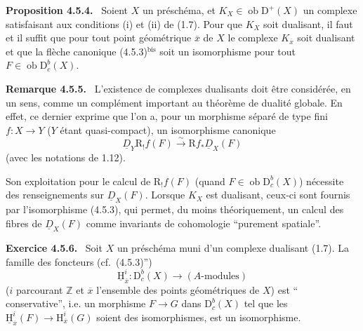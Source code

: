\documentclass[11pt]{article}
\providecommand{\uH}{\underline{\mathrm H}}
\newenvironment{statement}[1]{\par\medskip\noindent\textbf{#1.}\ }{\par\medskip}
\renewcommand{\H}{\mathrm{H}}
\newcommand{\R}{\mathrm{R}}\newcommand{\RHomCore}{\mathrm{RHom}}
\newcommand{\D}{\mathrm{D}}
\newcommand{\Z}{\mathbb{Z}}
\newcommand{\ob}{\operatorname{ob}}
\newcommand{\ol}[1]{\overline{#1}}
\providecommand{\ob}{\operatorname{ob}}
\providecommand{\R}{\mathrm R}
\providecommand{\Z}{\mathbb Z}
\begin{document}
\begin{statement}{Proposition 4.5.4}
Soient $X$ un préschéma, et $K_X\in\ob\D^+(X)$ un complexe satisfaisant aux conditions (i) et (ii) de (1.7). Pour que $K_X$ soit dualisant, il faut et il suffit que pour tout point géométrique $\ol{x}$ de $X$ le complexe $K_{\ol{x}}$ soit dualisant et que la flèche canonique (4.5.3)$^{\mathrm{bis}}$ soit un isomorphisme pour tout $F\in\ob\D_c^b(X)$.
\end{statement}

\begin{statement}{Remarque 4.5.5}
L'existence de complexes dualisants doit être considérée, en un sens, comme un complément important au théorème de dualité globale. En effet, ce dernier exprime que l'on a, pour un morphisme séparé de type fini $f:X\to Y$ ($Y$ étant quasi-compact), un isomorphisme canonique
\[
\underline{D}_Y\R_!f(F)\xrightarrow{\sim}\R f_*\underline{D}_X(F)
\]
(avec les notations de 1.12).

Son exploitation pour le calcul de $\R_!f(F)$ (quand $F\in\ob\D_c^b(X)$) nécessite des renseignements sur $\underline{D}_X(F)$. Lorsque $K_X$ est dualisant, ceux-ci sont fournis par l'isomorphisme (4.5.3), qui permet, du moins théoriquement, un calcul des fibres de $\underline{D}_X(F)$ comme invariants de cohomologie ``purement spatiale''.
\end{statement}

\begin{statement}{Exercice 4.5.6}
Soit $X$ un préschéma muni d'un complexe dualisant (1.7). La famille des foncteurs (cf.~(4.5.3)'')
\[
\underline{\H}_{\ol{x}}^i:\D_c^b(X)\longrightarrow (A\text{-modules})
\]
($i$ parcourant $\Z$ et $\ol{x}$ l'ensemble des points géométriques de $X$) est 
``%
conservative'', i.e. un morphisme $F\to G$ dans $\D_c^b(X)$ tel que les $\uH_{\ol{x}}^i(F)\to\H_{\ol{x}}^i(G)$ soient des isomorphismes, est un isomorphisme.
\end{statement}
\end{document}
